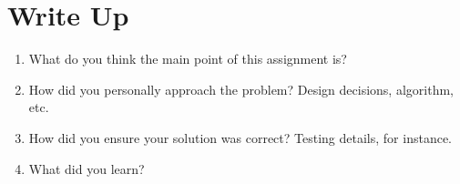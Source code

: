 \documentclass[letterpaper,10pt,draftclsnofoot,onecolumn,titlepage]{IEEEtran}
\begin{document}
\section{Write Up}
\begin{enumerate}
                \item What do you think the main point of this assignment is? \\
                \item How did you personally approach the problem? Design decisions, algorithm, etc. \\
                \item How did you ensure your solution was correct? Testing details, for instance.
                \item What did you learn?
\end{enumerate}
\end{document}
